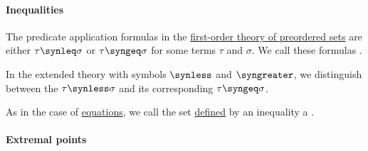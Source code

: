 \paragraph{Inequalities}

\begin{definition}\label{def:inequality}\mimprovised
  The predicate application formulas in the \hyperref[def:preordered_set/theory]{first-order theory of preordered sets} are either \( \tau \synleq \sigma \) or \( \tau \syngeq \sigma \) for some terms \( \tau \) and \( \sigma \). We call these formulas .

  In the extended theory with symbols \( \synless \) and \( \syngreater \), we distinguish between the  \( \tau \synless \sigma \) and its corresponding  \( \tau \syngeq \sigma \).

  As in the case of \hyperref[def:fol_equation]{equations}, we call the set \hyperref[def:fol_definability]{defined} by an inequality a .
\end{definition}

\paragraph{Extremal points}

